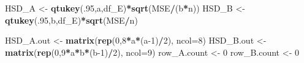 \documentclass[
]{book}
\newenvironment{Shaded}{\begin{snugshade}}{\end{snugshade}}
\newcommand{\AttributeTok}[1]{\textcolor[rgb]{0.13,0.29,0.53}{#1}}
\newcommand{\DecValTok}[1]{\textcolor[rgb]{0.00,0.00,0.81}{#1}}
\newcommand{\FunctionTok}[1]{\textcolor[rgb]{0.13,0.29,0.53}{\textbf{#1}}}
\newcommand{\NormalTok}[1]{#1}
\newcommand{\OtherTok}[1]{\textcolor[rgb]{0.56,0.35,0.01}{#1}}
\newcommand{\SpecialCharTok}[1]{\textcolor[rgb]{0.81,0.36,0.00}{\textbf{#1}}}
\begin{document}
\begin{Shaded}
\begin{Highlighting}[]
\NormalTok{HSD\_A }\OtherTok{\textless{}{-}} \FunctionTok{qtukey}\NormalTok{(.}\DecValTok{95}\NormalTok{,a,df\_E)}\SpecialCharTok{*}\FunctionTok{sqrt}\NormalTok{(MSE}\SpecialCharTok{/}\NormalTok{(b}\SpecialCharTok{*}\NormalTok{n))}
\NormalTok{HSD\_B }\OtherTok{\textless{}{-}} \FunctionTok{qtukey}\NormalTok{(.}\DecValTok{95}\NormalTok{,b,df\_E)}\SpecialCharTok{*}\FunctionTok{sqrt}\NormalTok{(MSE}\SpecialCharTok{/}\NormalTok{n)}

\NormalTok{HSD\_A.out }\OtherTok{\textless{}{-}} \FunctionTok{matrix}\NormalTok{(}\FunctionTok{rep}\NormalTok{(}\DecValTok{0}\NormalTok{,}\DecValTok{8}\SpecialCharTok{*}\NormalTok{a}\SpecialCharTok{*}\NormalTok{(a}\DecValTok{{-}1}\NormalTok{)}\SpecialCharTok{/}\DecValTok{2}\NormalTok{), }\AttributeTok{ncol=}\DecValTok{8}\NormalTok{)}
\NormalTok{HSD\_B.out }\OtherTok{\textless{}{-}} \FunctionTok{matrix}\NormalTok{(}\FunctionTok{rep}\NormalTok{(}\DecValTok{0}\NormalTok{,}\DecValTok{9}\SpecialCharTok{*}\NormalTok{a}\SpecialCharTok{*}\NormalTok{b}\SpecialCharTok{*}\NormalTok{(b}\DecValTok{{-}1}\NormalTok{)}\SpecialCharTok{/}\DecValTok{2}\NormalTok{), }\AttributeTok{ncol=}\DecValTok{9}\NormalTok{)}
\NormalTok{row\_A.count }\OtherTok{\textless{}{-}} \DecValTok{0}
\NormalTok{row\_B.count }\OtherTok{\textless{}{-}} \DecValTok{0}


\end{Highlighting}
\end{Shaded}
\end{document}
